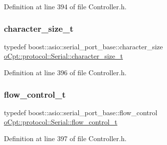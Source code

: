Definition at line 394 of file Controller.\+h.

\hypertarget{classo_cpt_1_1protocol_1_1_serial_a8799e83d5d812132c296dd4a6a17d6f6}{}\label{classo_cpt_1_1protocol_1_1_serial_a8799e83d5d812132c296dd4a6a17d6f6} 
\subsubsection{\texorpdfstring{character\+\_\+size\+\_\+t}{character\_size\_t}}
{\footnotesize\ttfamily typedef boost\+::asio\+::serial\+\_\+port\+\_\+base\+::character\+\_\+size \hyperlink{classo_cpt_1_1protocol_1_1_serial_a8799e83d5d812132c296dd4a6a17d6f6}{o\+Cpt\+::protocol\+::\+Serial\+::character\+\_\+size\+\_\+t}}



Definition at line 396 of file Controller.\+h.

\hypertarget{classo_cpt_1_1protocol_1_1_serial_ad32f1d64fb16a5443d7aae92e8b14232}{}\label{classo_cpt_1_1protocol_1_1_serial_ad32f1d64fb16a5443d7aae92e8b14232} 
\subsubsection{\texorpdfstring{flow\+\_\+control\+\_\+t}{flow\_control\_t}}
{\footnotesize\ttfamily typedef boost\+::asio\+::serial\+\_\+port\+\_\+base\+::flow\+\_\+control \hyperlink{classo_cpt_1_1protocol_1_1_serial_ad32f1d64fb16a5443d7aae92e8b14232}{o\+Cpt\+::protocol\+::\+Serial\+::flow\+\_\+control\+\_\+t}}



Definition at line 397 of file Controller.\+h.

\hypertarget{classo_cpt_1_1protocol_1_1_serial_ac9305799ef4be4eb50f1274184492f04}{}\label{classo_cpt_1_1protocol_1_1_serial_ac9305799ef4be4eb50f1274184492f04} 
